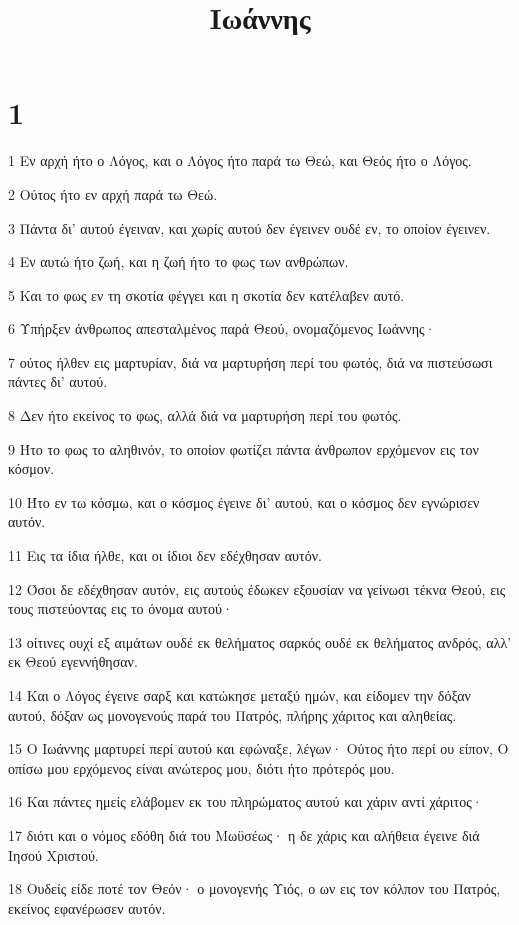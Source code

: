 

\title{Ιωάννης}


\chapter{1}

\par 1 Εν αρχή ήτο ο Λόγος, και ο Λόγος ήτο παρά τω Θεώ, και Θεός ήτο ο Λόγος.
\par 2 Ούτος ήτο εν αρχή παρά τω Θεώ.
\par 3 Πάντα δι' αυτού έγειναν, και χωρίς αυτού δεν έγεινεν ουδέ εν, το οποίον έγεινεν.
\par 4 Εν αυτώ ήτο ζωή, και η ζωή ήτο το φως των ανθρώπων.
\par 5 Και το φως εν τη σκοτία φέγγει και η σκοτία δεν κατέλαβεν αυτό.
\par 6 Υπήρξεν άνθρωπος απεσταλμένος παρά Θεού, ονομαζόμενος Ιωάννης·
\par 7 ούτος ήλθεν εις μαρτυρίαν, διά να μαρτυρήση περί του φωτός, διά να πιστεύσωσι πάντες δι' αυτού.
\par 8 Δεν ήτο εκείνος το φως, αλλά διά να μαρτυρήση περί του φωτός.
\par 9 Ήτο το φως το αληθινόν, το οποίον φωτίζει πάντα άνθρωπον ερχόμενον εις τον κόσμον.
\par 10 Ήτο εν τω κόσμω, και ο κόσμος έγεινε δι' αυτού, και ο κόσμος δεν εγνώρισεν αυτόν.
\par 11 Εις τα ίδια ήλθε, και οι ίδιοι δεν εδέχθησαν αυτόν.
\par 12 Όσοι δε εδέχθησαν αυτόν, εις αυτούς έδωκεν εξουσίαν να γείνωσι τέκνα Θεού, εις τους πιστεύοντας εις το όνομα αυτού·
\par 13 οίτινες ουχί εξ αιμάτων ουδέ εκ θελήματος σαρκός ουδέ εκ θελήματος ανδρός, αλλ' εκ Θεού εγεννήθησαν.
\par 14 Και ο Λόγος έγεινε σαρξ και κατώκησε μεταξύ ημών, και είδομεν την δόξαν αυτού, δόξαν ως μονογενούς παρά του Πατρός, πλήρης χάριτος και αληθείας.
\par 15 Ο Ιωάννης μαρτυρεί περί αυτού και εφώναξε, λέγων· Ούτος ήτο περί ου είπον, Ο οπίσω μου ερχόμενος είναι ανώτερος μου, διότι ήτο πρότερός μου.
\par 16 Και πάντες ημείς ελάβομεν εκ του πληρώματος αυτού και χάριν αντί χάριτος·
\par 17 διότι και ο νόμος εδόθη διά του Μωϋσέως· η δε χάρις και αλήθεια έγεινε διά Ιησού Χριστού.
\par 18 Ουδείς είδε ποτέ τον Θεόν· ο μονογενής Υιός, ο ων εις τον κόλπον του Πατρός, εκείνος εφανέρωσεν αυτόν.
